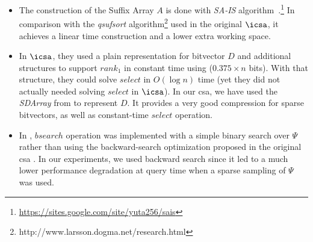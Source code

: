 	\begin{itemize}
		\item The construction of the Suffix Array $A$ is done with 
		{\em SA-IS} algorithm~\cite{nong2011two}.\footnote{\url{ https://sites.google.com/site/yuta256/sais}} 
		In comparison with the  {\em qsufsort} algorithm\footnote{
			http://www.larsson.dogma.net/research.html}
		\cite{Larsson:2007:FSS:1314704.1314853} used in the original $\icsa$, it achieves a linear time construction 
		and a lower extra working space. 
		
		\item In  $\icsa$, they used a plain representation for bitvector $D$ and additional structures to support
		$rank_1$ in constant time using ($0.375\times n$ bits). With that structure, they could solve $select$ in $O(\log n)$ time (yet 
		they did not actually needed solving $select$ in $\icsa$).
		In our \gls{csa}, we have used the {\em SDArray} from \cite{okanohara2007practical} to represent $D$. It provides a very 
		good compression for sparse bitvectors, as well as constant-time $select$ operation.
		\item In \cite{FBNCPR12}, $bsearch$ operation was implemented with a simple binary search over $\Psi$ rather than
		using the  backward-search optimization proposed in the original \gls{csa} \cite{Sad03}. In our experiments, we used
		backward search since it led to a much lower performance degradation at query time when a sparse sampling of $\Psi$ 
		was used.
		
	\end{itemize}

